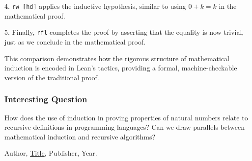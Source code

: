 \documentclass{article}
\theoremstyle{theorem}
\theoremstyle{definition}
\theoremstyle{remark}
\begin{document}
4. \texttt{rw [hd]} applies the inductive hypothesis, similar to using \(0 + k = k\) in the mathematical proof.

5. Finally, \texttt{rfl} completes the proof by asserting that the equality is now trivial, just as we conclude in the mathematical proof.

This comparison demonstrates how the rigorous structure of mathematical induction is encoded in Lean's tactics, providing a formal, machine-checkable version of the traditional proof.

\subsubsection{Interesting Question}

How does the use of induction in proving properties of natural numbers relate to recursive definitions in programming languages? Can we draw parallels between mathematical induction and recursive algorithms?


\begin{thebibliography}{99}
 Author, \href{https://en.wikipedia.org/wiki/LaTeX}{Title}, Publisher, Year.
\end{thebibliography}
\end{document}
